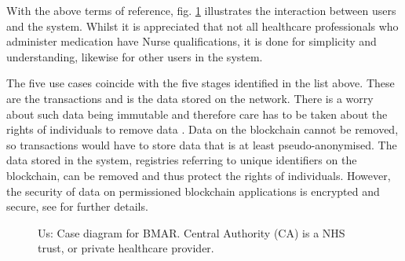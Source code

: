 \documentclass[runningheads]{llncs}
\begin{document}
With the above terms of reference, fig. \ref{fi:uc} illustrates the interaction between users and the system. Whilst it is appreciated that not all healthcare professionals who administer medication have Nurse qualifications, it is done for simplicity and understanding, likewise for other users in the system.

The five use cases coincide with the five stages identified in the list above. These are the transactions and is the data stored on the network. There is a worry about such data being immutable and therefore care has to be taken about the rights of individuals to remove data \cite{eu-2016-679}. Data on the blockchain cannot be removed, so transactions would have to store data that is at least pseudo-anonymised. The data stored in the system, registries referring to unique identifiers on the blockchain, can be removed and thus protect the rights of individuals. However, the security of data on permissioned blockchain applications is encrypted and secure, see \cite[ch. 5]{gupta:2018} for further details. %

\begin{figure}
\centering
{}
	\caption{Us: Case diagram for BMAR. Central Authority (CA) is a NHS trust, or private healthcare provider.}
\label{fi:uc}
\end{figure}
\end{document}

